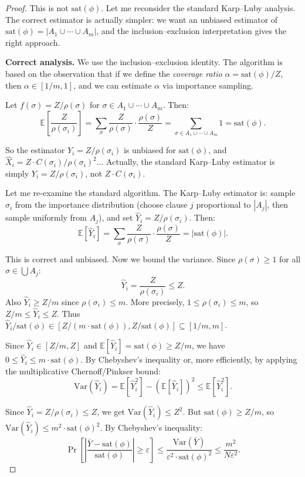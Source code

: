 \documentclass[twoside,12pt]{book}
\theoremstyle{plain}
\theoremstyle{definition}
\theoremstyle{remark}
\begin{document}
\begin{proof}
This is not $\text{sat}(\phi)$. Let me reconsider the standard Karp--Luby analysis. The correct estimator is actually simpler: we want an unbiased estimator of $\text{sat}(\phi) = |A_1 \cup \cdots \cup A_m|$, and the inclusion--exclusion interpretation gives the right approach.

\textbf{Correct analysis.} We use the inclusion--exclusion identity. The algorithm is based on the observation that if we define the \emph{coverage ratio} $\alpha = \text{sat}(\phi)/Z$, then $\alpha \in [1/m, 1]$, and we can estimate $\alpha$ via importance sampling.

Let $f(\sigma) = Z/\rho(\sigma)$ for $\sigma \in A_1 \cup \cdots \cup A_m$. Then:
\[
\mathbb{E}\!\left[\frac{Z}{\rho(\sigma_i)}\right] = \sum_{\sigma} \frac{Z}{\rho(\sigma)} \cdot \frac{\rho(\sigma)}{Z} = \sum_{\sigma \in A_1 \cup \cdots \cup A_m} 1 = \text{sat}(\phi).
\]

So the estimator $Y_i = Z/\rho(\sigma_i)$ is unbiased for $\text{sat}(\phi)$, and $\hat{X}_i = Z \cdot C(\sigma_i) / \rho(\sigma_i)^2$... Actually, the standard Karp--Luby estimator is simply $Y_i = Z/\rho(\sigma_i)$, not $Z \cdot C(\sigma_i)$.

Let me re-examine the standard algorithm. The Karp--Luby estimator is: sample $\sigma_i$ from the importance distribution (choose clause $j$ proportional to $|A_j|$, then sample uniformly from $A_j$), and set $\hat{Y}_i = Z/\rho(\sigma_i)$. Then:
\[
\mathbb{E}[\hat{Y}_i] = \sum_\sigma \frac{Z}{\rho(\sigma)} \cdot \frac{\rho(\sigma)}{Z} = |\text{sat}(\phi)|.
\]

This is correct and unbiased. Now we bound the variance. Since $\rho(\sigma) \geq 1$ for all $\sigma \in \bigcup A_j$:
\[
\hat{Y}_i = \frac{Z}{\rho(\sigma_i)} \leq Z.
\]
Also $\hat{Y}_i \geq Z/m$ since $\rho(\sigma_i) \leq m$. More precisely, $1 \leq \rho(\sigma_i) \leq m$, so $Z/m \leq \hat{Y}_i \leq Z$. Thus $\hat{Y}_i / \text{sat}(\phi) \in [Z/(m \cdot \text{sat}(\phi)), Z/\text{sat}(\phi)] \subseteq [1/m, m]$.

Since $\hat{Y}_i \in [Z/m, Z]$ and $\mathbb{E}[\hat{Y}_i] = \text{sat}(\phi) \geq Z/m$, we have $0 \leq \hat{Y}_i \leq m \cdot \text{sat}(\phi)$. By Chebyshev's inequality or, more efficiently, by applying the multiplicative Chernoff/Pinkser bound:
\[
\mathrm{Var}(\hat{Y}_i) = \mathbb{E}[\hat{Y}_i^2] - (\mathbb{E}[\hat{Y}_i])^2 \leq \mathbb{E}[\hat{Y}_i^2].
\]

Since $\hat{Y}_i = Z/\rho(\sigma_i) \leq Z$, we get $\mathrm{Var}(\hat{Y}_i) \leq Z^2$. But $\text{sat}(\phi) \geq Z/m$, so $\mathrm{Var}(\hat{Y}_i) \leq m^2 \cdot \text{sat}(\phi)^2$. By Chebyshev's inequality:
\[
\Pr\!\left[\left|\frac{\bar{Y} - \text{sat}(\phi)}{\text{sat}(\phi)}\right| \geq \varepsilon\right] \leq \frac{\mathrm{Var}(\bar{Y})}{\varepsilon^2 \cdot \text{sat}(\phi)^2} \leq \frac{m^2}{N \varepsilon^2}.
\]


\end{proof}
\end{document}
